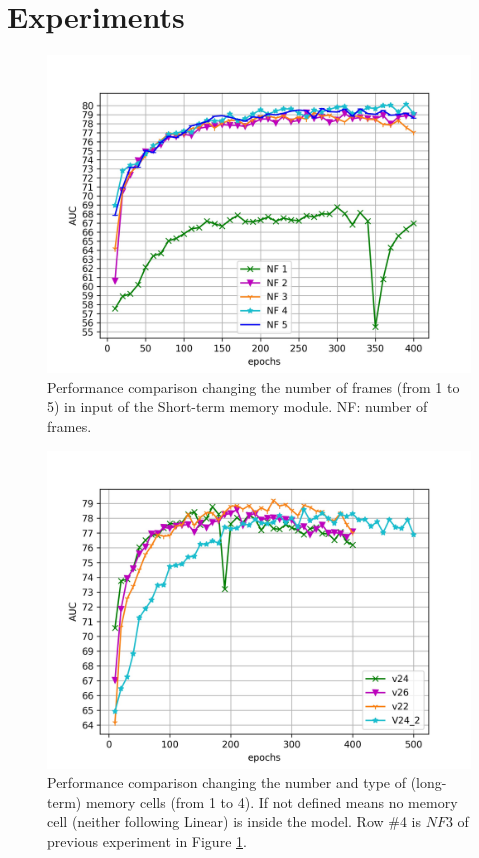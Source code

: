 \section{Experiments}
\label{sec:experiments}

\begin{figure}[t]
\centering
	\includegraphics[trim=0 0 0 0, clip, width=1.\linewidth]{images/exp_1.jpg}
	\caption{Performance comparison changing the number of frames (from 1 to 5) in input of the Short-term memory module. NF: number of frames.}
	\label{fig:num-frames-vst}
\end{figure}

\begin{figure}[t]
\centering
	\includegraphics[trim=0 0 0 0, clip, width=1.\linewidth]{images/exp_2.jpg}
	\caption{Performance comparison changing the number and type of (long-term) memory cells (from 1 to 4). If not defined means no memory cell (neither following Linear) is inside the model. Row \#4 is $NF 3$ of previous experiment in Figure \ref{fig:num-frames-vst}.}
	\label{fig:num-memory-cells}
\end{figure}


